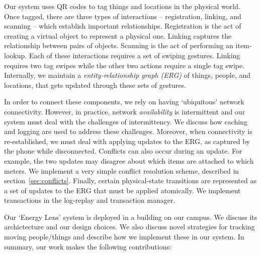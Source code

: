 Our system uses QR codes to tag things and locations in the physical world.  Once tagged, there are three types of interactions -- 
registration, linking, and scanning -- which establish important relationships.  Registration is the act of creating a virtual object 
to represent a physical one.  Linking captures the relationship between pairs of objects.  Scanning is the act of performing an item-lookup.
Each of these interactions requires a set of swiping gestures.  Linking requires two tag swipes while the other two actions
require a single tag swipe.  Internally, we maintain a \emph{entity-relationship graph (ERG)} of things, people, and locations, that gets
updated through these sets of gestures.

In order to connect these components, we rely on having `ubiquitous' network connectivity.  However, in practice, network
\emph{availability} is intermittent and our system must deal with the challenges of intermittency.  We discuss how caching
and logging are used to address these challenges.  Moreover, when connectivity is re-established, we must deal with
applying updates to the ERG, as captured by the phone while disconnected.  
Conflicts can also occur during an update.  For example, the two updates may disagree about which items are attached
to which meters.  We implement a very simple conflict resolution scheme, described in section~\ref{sec:conflicts}.
Finally, certain physical-state transitions are represented as a set of updates to the ERG that must be applied 
atomically.  We implement transactions in the log-replay and transaction manager.

Our `Energy Lens' system is deployed in a building on our campus.  We discuss
its archictecture and our design choices.  
We also discuss novel strategies for tracking moving people/things and describe how we implement these in our system.  In summary, our work
makes the following contributions:


